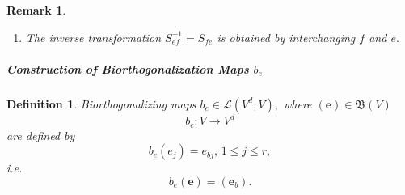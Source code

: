 \documentclass[aps,preprint]{revtex4}
\newtheorem{definition}[theorem]{Definition}
\newtheorem{remark}[theorem]{Remark}
\begin{document}
\begin{remark}
\begin{enumerate}
\begin{enumerate}
\begin{equation}
\begin{array}{ccc}
\vdots & \ddots & \vdots \\ 
f_{br}\left( e_{1}\right) & \cdots & f_{br}\left( e_{r}\right)%
\end{array}%
\right) =\left( 
\begin{array}{ccc}
f_{1} & \cdots & f_{r}%
\end{array}%
\right) \mathcal{R}_{f}\left( S_{ef}\right)
\end{equation}%
and 
\begin{equation}
\left( 
\begin{array}{c}
e_{1} \\ 
\vdots \\ 
e_{r}%
\end{array}%
\right) =\left( 
\begin{array}{ccc}
f_{b1}\left( e_{1}\right) & \cdots & f_{b1}\left( e_{r}\right) \\ 
\vdots & \ddots & \vdots \\ 
f_{br}\left( e_{1}\right) & \cdots & f_{br}\left( e_{r}\right)%
\end{array}%
\right) ^{t}\left( 
\begin{array}{c}
f_{1} \\ 
\vdots \\ 
f_{r}%
\end{array}%
\right) .
\end{equation}
\end{enumerate}

\item The inverse transformation $S_{ef}^{-1}=S_{fe}$ is obtained by
interchanging $f$ and $e.$
\end{enumerate}
\end{remark}

\subparagraph{Construction of Biorthogonalization Maps $b_{e}$}

\begin{definition}
Biorthogonalizing maps $b_{e}\in \mathcal{L}\left( V^{d},V\right) ,$ where $%
\left( \boldsymbol{e}\right) \in \mathfrak{B}\left( V\right) $ 
\begin{equation}
b_{e}:V\rightarrow V^{d}
\end{equation}%
are defined by 
\begin{equation}
b_{e}\left( e_{j}\right) =e_{bj},\,1\leq j\leq r,
\end{equation}%
i.e. 
\begin{equation}
b_{e}\left( \boldsymbol{e}\right) =\left( \boldsymbol{e}_{b}\right) .
\end{equation}
\end{definition}
\end{document}
